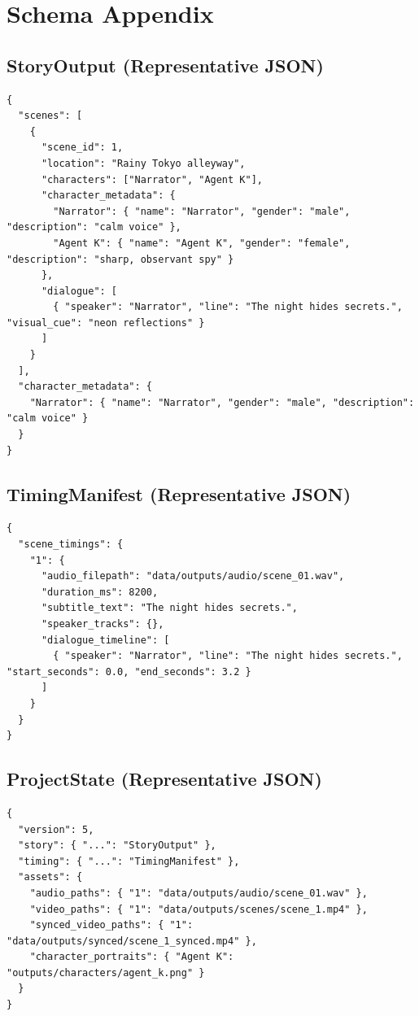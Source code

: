 \documentclass[runningheads]{llncs}
\begin{document}
\appendix
\section{Schema Appendix}
\subsection{StoryOutput (Representative JSON)}
\begin{lstlisting}
{
  "scenes": [
    {
      "scene_id": 1,
      "location": "Rainy Tokyo alleyway",
      "characters": ["Narrator", "Agent K"],
      "character_metadata": {
        "Narrator": { "name": "Narrator", "gender": "male", "description": "calm voice" },
        "Agent K": { "name": "Agent K", "gender": "female", "description": "sharp, observant spy" }
      },
      "dialogue": [
        { "speaker": "Narrator", "line": "The night hides secrets.", "visual_cue": "neon reflections" }
      ]
    }
  ],
  "character_metadata": {
    "Narrator": { "name": "Narrator", "gender": "male", "description": "calm voice" }
  }
}
\end{lstlisting}

\subsection{TimingManifest (Representative JSON)}
\begin{lstlisting}
{
  "scene_timings": {
    "1": {
      "audio_filepath": "data/outputs/audio/scene_01.wav",
      "duration_ms": 8200,
      "subtitle_text": "The night hides secrets.",
      "speaker_tracks": {},
      "dialogue_timeline": [
        { "speaker": "Narrator", "line": "The night hides secrets.", "start_seconds": 0.0, "end_seconds": 3.2 }
      ]
    }
  }
}
\end{lstlisting}

\subsection{ProjectState (Representative JSON)}
\begin{lstlisting}
{
  "version": 5,
  "story": { "...": "StoryOutput" },
  "timing": { "...": "TimingManifest" },
  "assets": {
    "audio_paths": { "1": "data/outputs/audio/scene_01.wav" },
    "video_paths": { "1": "data/outputs/scenes/scene_1.mp4" },
    "synced_video_paths": { "1": "data/outputs/synced/scene_1_synced.mp4" },
    "character_portraits": { "Agent K": "outputs/characters/agent_k.png" }
  }
}
\end{lstlisting}
\end{document}
